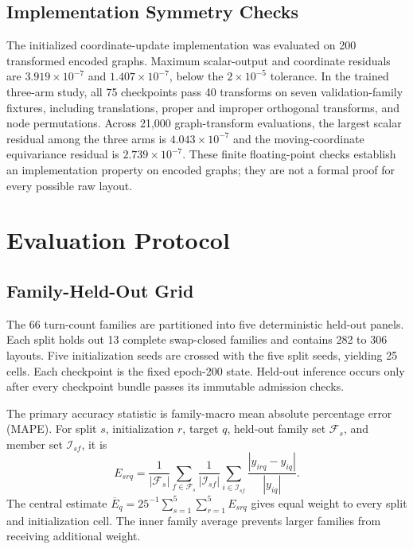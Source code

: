 \documentclass[journal]{IEEEtran}
\begin{document}
\subsection{Implementation Symmetry Checks}
The initialized coordinate-update implementation was evaluated on 200 transformed encoded graphs. Maximum scalar-output and coordinate residuals are $3.919\times10^{-7}$ and $1.407\times10^{-7}$, below the $2\times10^{-5}$ tolerance. In the trained three-arm study, all 75 checkpoints pass 40 transforms on seven validation-family fixtures, including translations, proper and improper orthogonal transforms, and node permutations. Across 21,000 graph-transform evaluations, the largest scalar residual among the three arms is $4.043\times10^{-7}$ and the moving-coordinate equivariance residual is $2.739\times10^{-7}$. These finite floating-point checks establish an implementation property on encoded graphs; they are not a formal proof for every possible raw layout.

\section{Evaluation Protocol}
\subsection{Family-Held-Out Grid}
The 66 turn-count families are partitioned into five deterministic held-out panels. Each split holds out 13 complete swap-closed families and contains 282 to 306 layouts. Five initialization seeds are crossed with the five split seeds, yielding 25 cells. Each checkpoint is the fixed epoch-200 state. Held-out inference occurs only after every checkpoint bundle passes its immutable admission checks.

The primary accuracy statistic is family-macro mean absolute percentage error (MAPE). For split $s$, initialization $r$, target $q$, held-out family set $\mathcal{F}_{s}$, and member set $\mathcal{I}_{sf}$, it is
\begin{equation}
E_{srq}=\frac{1}{|\mathcal{F}_{s}|}\sum_{f\in\mathcal{F}_{s}}
\frac{1}{|\mathcal{I}_{sf}|}\sum_{i\in\mathcal{I}_{sf}}
\frac{|\widehat{y}_{irq}-y_{iq}|}{|y_{iq}|}.
\label{eq:family_macro}
\end{equation}
The central estimate $\overline{E}_{q}=25^{-1}\sum_{s=1}^{5}\sum_{r=1}^{5}E_{srq}$ gives equal weight to every split and initialization cell. The inner family average prevents larger families from receiving additional weight.
\end{document}
